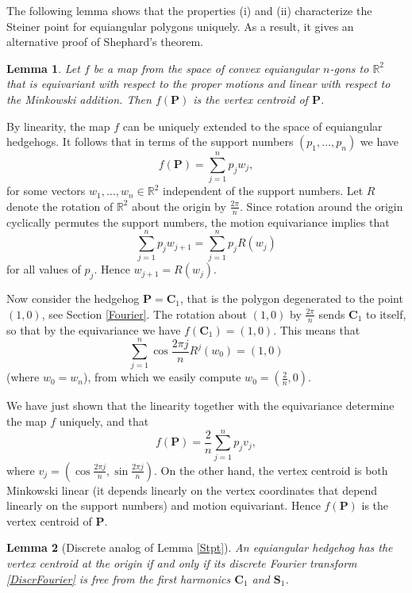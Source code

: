 \documentclass[12pt]{article}
\makeatletter
\newtheorem{lemma}{Lemma}[section]
\renewenvironment{proof}[1][\proofname] 
{\par\pushQED{\qed}\normalfont\topsep6\p@\@plus6\p@\relax\trivlist\item[\hskip\labelsep\bfseries#1\@addpunct{.}]\ignorespaces}{\popQED\endtrivlist\@endpefalse}
\newcommand{\R}{\mathbb {R}}
\renewcommand{\P}{\mathbf{P}}
\makeatother
\begin{document}
The following lemma shows that the properties (i) and (ii) characterize the Steiner point for equiangular polygons uniquely. As a result, it gives an alternative proof of Shephard's theorem.
\begin{lemma}
Let $f$ be a map from the space of convex equiangular $n$-gons to $\R^2$ that is equivariant with respect to the proper motions and linear with respect to the Minkowski addition. Then $f(\P)$ is the vertex centroid of $\P$.
\end{lemma}
\begin{proof}
By linearity, the map $f$ can be uniquely extended to the space of equiangular hedgehogs. It follows that in terms of the support numbers $(p_1, \ldots, p_n)$ we have
\[
f(\P) = \sum_{j=1}^n p_j w_j,
\]
for some vectors $w_1, \ldots, w_n \in \R^2$ independent of the support numbers. Let $R$ denote the rotation of $\R^2$ about the origin by $\frac{2\pi}{n}$. Since rotation around the origin cyclically permutes the support numbers, the motion equivariance implies that
\[
\sum_{j=1}^n p_j w_{j+1} = \sum_{j=1}^n p_j R(w_j)
\]
for all values of $p_j$. Hence $w_{j+1} = R(w_j)$. 

Now consider the hedgehog $\P = \mathbf{C}_1$, that is the polygon degenerated to the point $(1,0)$, see Section \ref{Fourier}. The rotation about $(1,0)$ by $\frac{2\pi}{n}$ sends $\mathbf{C}_1$ to itself, so that by the equivariance we have $f(\mathbf{C}_1) = (1,0)$. This means that
\[
\sum_{j=1}^n \cos\frac{2\pi j}{n} R^j(w_0) = (1,0)
\]
(where $w_0 = w_n$), from which we easily compute $w_0 = (\frac2n, 0)$.

We have just shown that the linearity together with the equivariance determine the map $f$ uniquely, and that
\begin{equation}
\label{eqn:VertCentr}
f(\P) = \frac{2}{n} \sum_{j=1}^n p_jv_j,
\end{equation}
where $v_j=(\cos \frac{2\pi j}{n}, \sin \frac{2\pi j}{n})$. On the other hand, the vertex centroid is both Minkowski linear (it depends linearly on the vertex coordinates that depend linearly on the support numbers) and motion equivariant. Hence $f(\P)$ is the vertex centroid of $\P$.
\end{proof}


\begin{lemma}[Discrete analog of Lemma \ref{Stpt}]
\label{PseudoSteiner2Origin}
An equiangular hedgehog has the vertex centroid at the origin if and only if its discrete Fourier transform \eqref{DiscrFourier} is free from the first harmonics $\mathbf{C}_1$ and $\mathbf{S}_1$.
\end{lemma}
\end{document}
